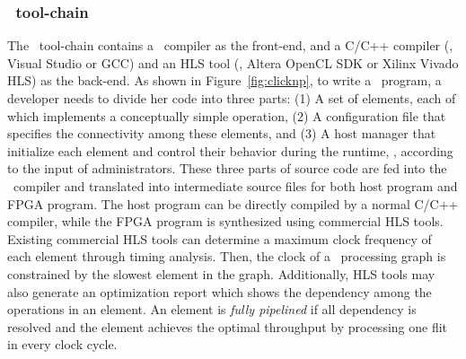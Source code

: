 \subsubsection{\name\ tool-chain}
\label{subsec:toolchain}
The \name\ tool-chain contains a \name\ compiler as the front-end, and a C/C++ compiler (\eg, Visual Studio or GCC) and an HLS tool 
(\eg, Altera OpenCL SDK or Xilinx Vivado HLS) as the back-end.
As shown in Figure~\ref{fig:clicknp}, to write a \name\ program, a developer needs to divide her code into three parts:
(1) A set of elements, each of which implements a conceptually simple operation,
(2) A configuration file that specifies the connectivity among these elements,
and (3) A host manager that initialize each element and control their behavior during the runtime, \eg, according to the input of administrators.
%
These three parts of source code are fed into the \name\ compiler and translated 
into intermediate source files for both host program and FPGA program. 
The host program can be directly compiled by a normal C/C++ compiler, while the FPGA program is synthesized using commercial HLS tools.
%
Existing commercial HLS tools can determine a maximum clock frequency of 
each element through timing analysis. 
Then, the clock of a \name\ processing graph is constrained by the slowest element in the graph.
%
Additionally, HLS tools may also generate an optimization report which shows the 
dependency among the operations in an element. An element is \textit{fully pipelined}
if all dependency is resolved and the element achieves the optimal throughput by 
processing one flit in every clock cycle.

